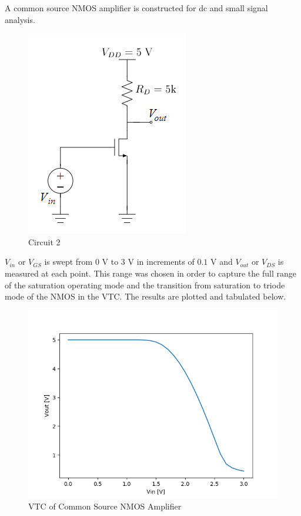 A common source NMOS amplifier is constructed for dc and small signal analysis.

\FloatBarrier

\begin{figure}[h!]
	\centering
	\includegraphics[scale=0.75]{../images/circuit_2.PNG}
	\caption{Circuit 2}
	\label{fig:circuit_2}
\end{figure}

\FloatBarrier

$V_{in}$ or $V_{GS}$ is swept from $0$ \si{\volt} to $3$ \si{\volt} in increments of $0.1$ \si{\volt} and $V_{out}$ or $V_{DS}$ is measured at each point.
This range was chosen in order to capture the full range of the saturation operating mode and the transition from saturation to triode mode of the NMOS in the VTC.
The results are plotted and tabulated below.

\FloatBarrier

\begin{figure}[h!]
	\centering
	\includegraphics[scale=0.75]{../images/sim2_vtc.PNG}
	\caption{VTC of Common Source NMOS Amplifier}
	\label{fig:part2_vtc}
\end{figure}

